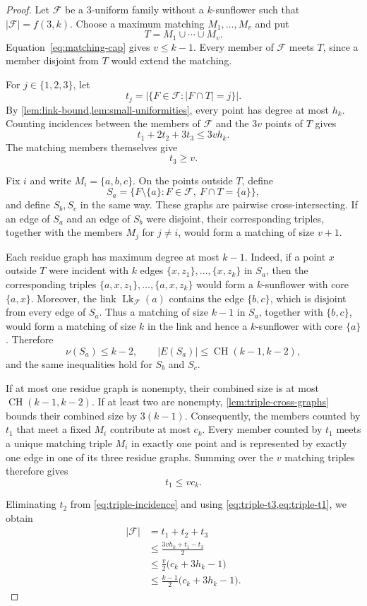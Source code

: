 \documentclass[11pt]{article}
\numberwithin{equation}{section}
\theoremstyle{definition}
\theoremstyle{remark}
\newcommand{\F}{\mathcal F}
\newcommand{\CH}{\operatorname{CH}}
\newcommand{\Lk}{\operatorname{Lk}}
\begin{document}
\begin{proof}
Let $\F$ be a $3$-uniform family without a $k$-sunflower such that
$|\F|=f(3,k)$. Choose a maximum matching $M_1,\ldots,M_v$ and put
\[
 T=M_1\cup\cdots\cup M_v.
\]
Equation~\eqref{eq:matching-cap} gives $v\le k-1$. Every member of $\F$ meets
$T$, since a member disjoint from $T$ would extend the matching.

For $j\in\{1,2,3\}$, let
\[
 t_j=|\{F\in\F:|F\cap T|=j\}|.
\]
By \cref{lem:link-bound,lem:small-uniformities}, every point has degree at
most $h_k$. Counting incidences between the members of $\F$ and the $3v$
points of $T$ gives
\begin{equation}
 t_1+2t_2+3t_3\le3v h_k.
 \label{eq:triple-incidence}
\end{equation}
The matching members themselves give
\begin{equation}
 t_3\ge v.
 \label{eq:triple-t3}
\end{equation}

Fix $i$ and write $M_i=\{a,b,c\}$. On the points outside $T$, define
\[
 S_a=\{F\setminus\{a\}:F\in\F,\ F\cap T=\{a\}\},
\]
and define $S_b,S_c$ in the same way. These graphs are pairwise
cross-intersecting. If an edge of $S_a$ and an edge of $S_b$ were disjoint,
their corresponding triples, together with the members $M_j$ for $j\ne i$,
would form a matching of size $v+1$.

Each residue graph has maximum degree at most $k-1$. Indeed, if a point $x$
outside $T$ were incident with $k$ edges $\{x,z_1\},\ldots,\{x,z_k\}$ in
$S_a$, then the corresponding triples
$\{a,x,z_1\},\ldots,\{a,x,z_k\}$ would form a $k$-sunflower with core
$\{a,x\}$. Moreover, the link $\Lk_{\F}(a)$ contains the edge $\{b,c\}$,
which is disjoint from every edge of $S_a$. Thus a matching of size $k-1$ in
$S_a$, together with $\{b,c\}$, would form a matching of size $k$ in the link
and hence a $k$-sunflower with core $\{a\}$. Therefore
\[
 \nu(S_a)\le k-2,
 \qquad
 |E(S_a)|\le\CH(k-1,k-2),
\]
and the same inequalities hold for $S_b$ and $S_c$.

If at most one residue graph is nonempty, their combined size is at most
$\CH(k-1,k-2)$. If at least two are nonempty,
\cref{lem:triple-cross-graphs} bounds their combined size by $3(k-1)$.
Consequently, the members counted by $t_1$ that meet a fixed $M_i$ contribute
at most $c_k$. Every member counted by $t_1$ meets a unique matching triple
$M_i$ in exactly one point and is represented by exactly one edge in one of
its three residue graphs. Summing over the $v$ matching triples therefore
gives
\begin{equation}
 t_1\le v c_k.
 \label{eq:triple-t1}
\end{equation}

Eliminating $t_2$ from \cref{eq:triple-incidence} and using
\cref{eq:triple-t3,eq:triple-t1}, we obtain
\begin{align*}
 |\F|
  &=t_1+t_2+t_3\\
  &\le\frac{3v h_k+t_1-t_3}{2}\\
  &\le\frac v2\bigl(c_k+3h_k-1\bigr)\\
  &\le\frac{k-1}{2}\bigl(c_k+3h_k-1\bigr).
\end{align*}
\end{proof}
\end{document}
